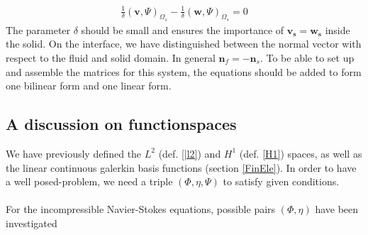 \begin{align}
\frac{1}{\delta}(\mathbf{v},\Psi)_{\Omega_s} - \frac{1}{\delta}(\mathbf{w},\Psi)_{\Omega_s} = 0 \label{VarMesh2}
\end{align}
The parameter $\delta $ should be small and ensures the importance of $\mathbf{v_s} = \mathbf{w_s}$ inside the solid. On the interface, we have distinguished between the normal vector with respect to the fluid and solid domain. In general $\mathbf{n}_f = -\mathbf{n}_s$. To be able to set up and assemble the matrices for this system, the equations should be added to form one bilinear form and one linear form. 
\subsection{A discussion on functionspaces}
We have previously defined the $L^2$ (def. \ref{|l2}) and $H^1$ (def. \ref{H1}) spaces, as well as the linear continuous galerkin basis functions (section \ref{FinEle}). In order to have a well posed-problem, we need a triple $(\Phi,\eta, \Psi)$ to satisfy given conditions. \\
\\
For the incompressible Navier-Stokes equations, possible pairs $(\Phi, \eta)$ have been investigated 

